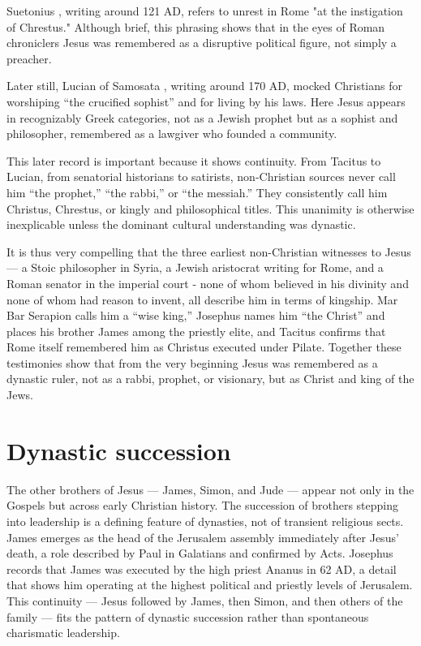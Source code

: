 Suetonius \cite[25.4]{suetonius:claudius}, writing around 121 AD, refers to unrest in Rome "at the instigation of Chrestus."
Although brief, this phrasing shows that in the eyes of Roman chroniclers Jesus was remembered as a disruptive political figure, not simply a preacher.

Later still, Lucian of Samosata \cite[13]{lucian:peregrinus}, writing around 170 AD, mocked Christians for worshiping ``the crucified sophist'' and for living by his laws.
Here Jesus appears in recognizably Greek categories, not as a Jewish prophet but as a sophist and philosopher, remembered as a lawgiver who founded a community.

This later record is important because it shows continuity.
From Tacitus to Lucian, from senatorial historians to satirists, non-Christian sources never call him “the prophet,” “the rabbi,” or “the messiah.”
They consistently call him Christus, Chrestus, or kingly and philosophical titles.
This unanimity is otherwise inexplicable unless the dominant cultural understanding was dynastic.

It is thus very compelling that the three earliest non-Christian witnesses to Jesus --- a Stoic philosopher in Syria, a Jewish aristocrat writing for Rome, and a Roman senator in the imperial court - none of whom believed in his divinity and none of whom had reason to invent, all describe him in terms of kingship.
Mar Bar Serapion calls him a “wise king,” Josephus names him “the Christ” and places his brother James among the priestly elite, and Tacitus confirms that Rome itself remembered him as Christus executed under Pilate.
Together these testimonies show that from the very beginning Jesus was remembered as a dynastic ruler, not as a rabbi, prophet, or visionary, but as Christ and king of the Jews.

\section{Dynastic succession}\label{sec:dynastic-succession}

The other brothers of Jesus --- James, Simon, and Jude --- appear not only in the Gospels but across early Christian history.
The succession of brothers stepping into leadership is a defining feature of dynasties, not of transient religious sects.
James emerges as the head of the Jerusalem assembly immediately after Jesus’ death, a role described by Paul in Galatians and confirmed by Acts.
Josephus records that James was executed by the high priest Ananus in 62 AD, a detail that shows him operating at the highest political and priestly levels of Jerusalem.
This continuity --- Jesus followed by James, then Simon, and then others of the family --- fits the pattern of dynastic succession rather than spontaneous charismatic leadership.

